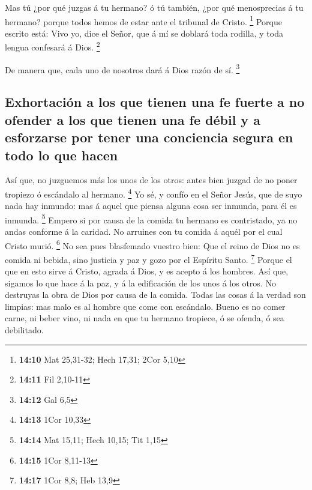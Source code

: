  Mas tú ¿por qué juzgas á tu hermano? ó tú también, ¿por
qué menosprecias á tu hermano? porque todos hemos de estar ante el
tribunal de Cristo. \footnote{\textbf{14:10} Mat 25,31-32; Hech 17,31;
  2Cor 5,10}  Porque escrito está: Vivo yo, dice el
Señor, que á mí se doblará toda rodilla, y toda lengua confesará á Dios.
\footnote{\textbf{14:11} Fil 2,10-11}

 De manera que, cada uno de nosotros dará á Dios razón de
sí. \footnote{\textbf{14:12} Gal 6,5}

\hypertarget{exhortaciuxf3n-a-los-que-tienen-una-fe-fuerte-a-no-ofender-a-los-que-tienen-una-fe-duxe9bil-y-a-esforzarse-por-tener-una-conciencia-segura-en-todo-lo-que-hacen}{%
\subsection{Exhortación a los que tienen una fe fuerte a no ofender a
los que tienen una fe débil y a esforzarse por tener una conciencia
segura en todo lo que
hacen}\label{exhortaciuxf3n-a-los-que-tienen-una-fe-fuerte-a-no-ofender-a-los-que-tienen-una-fe-duxe9bil-y-a-esforzarse-por-tener-una-conciencia-segura-en-todo-lo-que-hacen}}

 Así que, no juzguemos más los unos de los otros: antes
bien juzgad de no poner tropiezo ó escándalo al hermano. \footnote{\textbf{14:13}
  1Cor 10,33}  Yo sé, y confío en el Señor Jesús, que de
suyo nada hay inmundo: mas á aquel que piensa alguna cosa ser inmunda,
para él es inmunda. \footnote{\textbf{14:14} Mat 15,11; Hech 10,15; Tit
  1,15}  Empero si por causa de la comida tu hermano es
contristado, ya no andas conforme á la caridad. No arruines con tu
comida á aquél por el cual Cristo murió. \footnote{\textbf{14:15} 1Cor
  8,11-13}  No sea pues blasfemado vuestro bien:
 Que el reino de Dios no es comida ni bebida, sino
justicia y paz y gozo por el Espíritu Santo. \footnote{\textbf{14:17}
  1Cor 8,8; Heb 13,9}  Porque el que en esto sirve á
Cristo, agrada á Dios, y es acepto á los hombres.  Así
que, sigamos lo que hace á la paz, y á la edificación de los unos á los
otros.  No destruyas la obra de Dios por causa de la
comida. Todas las cosas á la verdad son limpias: mas malo es al hombre
que come con escándalo.  Bueno es no comer carne, ni
beber vino, ni nada en que tu hermano tropiece, ó se ofenda, ó sea
debilitado.

